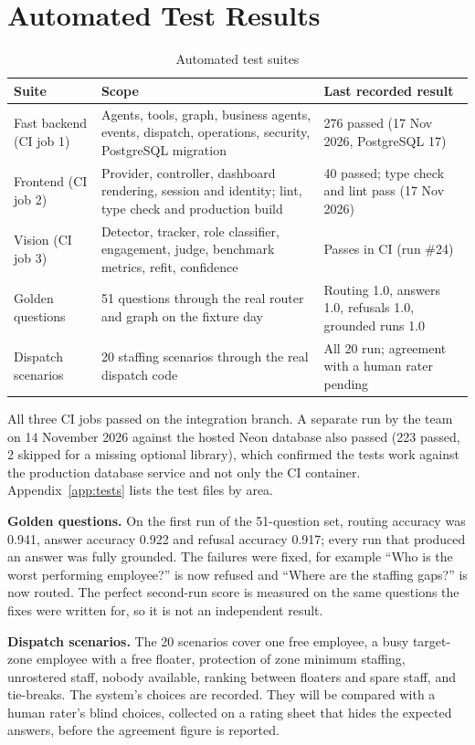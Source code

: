\section{Automated Test Results}
\begin{table}[H]
\centering
\caption{Automated test suites}\label{tab:suites}
\begin{tabular}{P{0.25\textwidth}P{0.38\textwidth}P{0.28\textwidth}}
\toprule
Suite & Scope & Last recorded result\\
\midrule
Fast backend (CI job 1) & Agents, tools, graph, business agents, events, dispatch, operations, security, PostgreSQL migration & 276 passed (17 Nov 2026, PostgreSQL 17)\\
Frontend (CI job 2) & Provider, controller, dashboard rendering, session and identity; lint, type check and production build & 40 passed; type check and lint pass (17 Nov 2026)\\
Vision (CI job 3) & Detector, tracker, role classifier, engagement, judge, benchmark metrics, refit, confidence & Passes in CI (run \#24)\\
Golden questions & 51 questions through the real router and graph on the fixture day & Routing 1.0, answers 1.0, refusals 1.0, grounded runs 1.0\\
Dispatch scenarios & 20 staffing scenarios through the real dispatch code & All 20 run; agreement with a human rater pending\\
\bottomrule
\end{tabular}
\end{table}

All three CI jobs passed on the integration branch. A separate run by the team on 14 November 2026 against the hosted Neon database also passed (223 passed, 2 skipped for a missing optional library), which confirmed the tests work against the production database service and not only the CI container. Appendix~\ref{app:tests} lists the test files by area.

\textbf{Golden questions.} On the first run of the 51-question set, routing accuracy was 0.941, answer accuracy 0.922 and refusal accuracy 0.917; every run that produced an answer was fully grounded. The failures were fixed, for example ``Who is the worst performing employee?'' is now refused and ``Where are the staffing gaps?'' is now routed. The perfect second-run score is measured on the same questions the fixes were written for, so it is not an independent result.

\textbf{Dispatch scenarios.} The 20 scenarios cover one free employee, a busy target-zone employee with a free floater, protection of zone minimum staffing, unrostered staff, nobody available, ranking between floaters and spare staff, and tie-breaks. The system's choices are recorded. They will be compared with a human rater's blind choices, collected on a rating sheet that hides the expected answers, before the agreement figure is reported.

